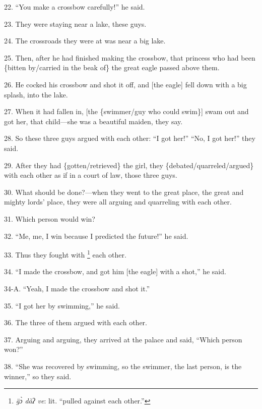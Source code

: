22. ``You make a crossbow carefully!'' he said.

23. They were staying near a lake, these guys.

24. The crossroads they were at was near a big lake.

25. Then, after he had finished making the crossbow, that princess who had been
\{bitten by/carried in the beak of\} the great eagle passed above them.

26. He cocked his crossbow and shot it off, and [the eagle] fell down with a big
splash, into the lake.

27. When it had fallen in, [the \{swimmer/guy who could swim\}] swam out and got
her, that child---she was a beautiful maiden, they say.

28. So these three guys argued with each other: ``I got her!'' ``No, I got her!''
they said.

29. After they had \{gotten/retrieved\} the girl, they \{debated/quarreled/argued\}
with each other as if in a court of law, those three guys.

30. What should be done?---when they went to the great place, the great and mighty
lords' place, they were all arguing and quarreling with each other.

31. Which person would win?

32. ``Me, me, I win because I predicted the future!'' he said.

33. Thus they fought with \footnote{\textit{g̈ɔ̀ dàʔ ve}: lit. ``pulled against each other.''} each other.

34. ``I made the crossbow, and got him [the eagle] with a shot,'' he said.

34-A. ``Yeah, I made the crossbow and shot it.''

35. ``I got her by swimming,'' he said.

36. The three of them argued with each other.

37. Arguing and arguing, they arrived at the palace and said, ``Which person won?''

38. ``She was recovered by swimming, so the swimmer, the last person, is the winner,''
so they said.

